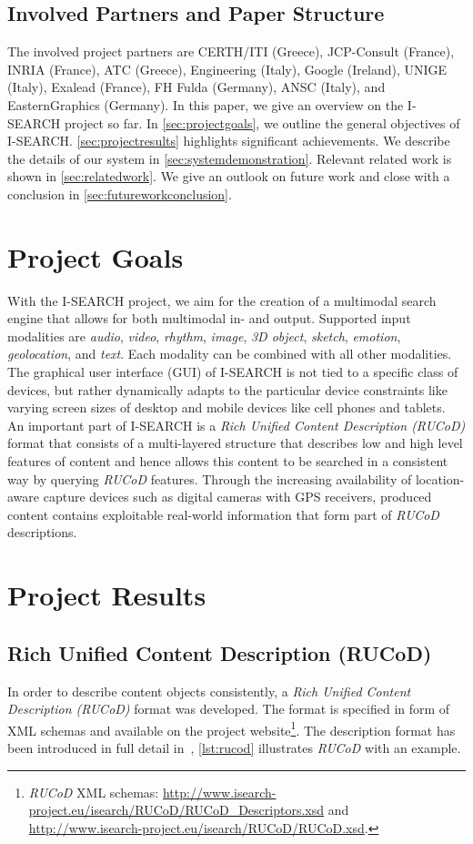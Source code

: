 \documentclass{acm_proc_article-sp}
\let\oldemph\emph
\renewcommand{\emph}[1]{\oldemph{\fontsize{9}{9}\selectfont #1}}
\newcommand{\inlinelistingsize}{\fontsize{8pt}{11pt}}
\let\oldurl\url
\renewcommand{\url}[1]{\inlinelistingsize\oldurl{#1}}
\begin{document}
\subsection{Involved Partners and Paper Structure}
The involved project partners are CERTH/ITI (Greece), JCP-Consult (France), INRIA (France), ATC (Greece), Engineering (Italy), Google (Ireland), UNIGE (Italy), Exalead (France), FH Fulda (Germany), ANSC (Italy), and EasternGraphics (Germany).
In this paper, we give an overview on the \mbox{I-SEARCH} project so far.
In \autoref{sec:projectgoals}, we outline the general objectives of  \mbox{I-SEARCH}.
\autoref{sec:projectresults} highlights significant achievements.
We describe the details of our system in \autoref{sec:systemdemonstration}.
Relevant related work is shown in \autoref{sec:relatedwork}.
We give an outlook on future work and close with a conclusion in \autoref{sec:futureworkconclusion}.

\section{Project Goals} \label{sec:projectgoals}
With the \mbox{I-SEARCH} project, we aim for the creation of a multimodal search engine that allows for both multimodal in- and output.
Supported input modalities are \emph{audio}, \emph{video}, \emph{rhythm}, \emph{image}, \emph{3D object}, \emph{sketch}, \emph{emotion}, \emph{geolocation}, and \emph{text}.
Each modality can be combined with all other modalities.
The graphical user interface (GUI) of \mbox{I-SEARCH} is not tied to a specific class of devices, but rather dynamically adapts to the particular device constraints like varying screen sizes of desktop and mobile devices like cell phones and tablets.
An important part of \mbox{I-SEARCH} is a \emph{Rich Unified Content Description (RUCoD)} format that consists of a multi-layered structure that describes low and high level features of content and hence allows this content to be searched in a consistent way by querying \emph{RUCoD} features.
Through the increasing availability of location-aware capture devices such as digital cameras with GPS receivers, produced content contains exploitable real-world information that form part of \emph{RUCoD} descriptions.

\section{Project Results} \label{sec:projectresults}

\subsection{Rich Unified Content Description (RUCoD)}
In order to describe content objects consistently, a \emph{Rich Unified Content Description (RUCoD)} format was developed.
The format is specified in form of XML schemas and available on the project website\footnote{\emph{RUCoD} XML schemas: \url{http://www.isearch-project.eu/isearch/RUCoD/RUCoD_Descriptors.xsd} and \url{http://www.isearch-project.eu/isearch/RUCoD/RUCoD.xsd}.}.
The description format has been introduced in full detail in~\cite{ijmis2010}, \autoref{lst:rucod} illustrates \emph{RUCoD} with an example.
\end{document}
